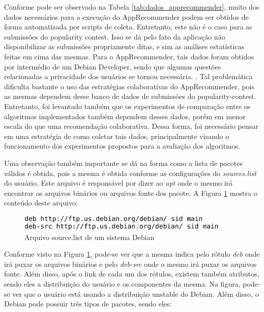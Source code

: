 Conforme pode ser observado na Tabela \ref{tab:dados_apprecommender}, muito dos dados
necessários para a execução do AppRecommender podem ser obtidos de forma automatizada
por scripts de coleta. Entretanto, este não é o caso para as submissões do
popularity contest. Isso se dá pelo fato da aplicação não disponibilizar as submissões
propriamente ditas, e sim as análises estatísticas feitas em cima das mesmas. Para o
AppRecommender, tais dados foram obtidos por intermédio de um Debian Developer, sendo
que algumas questões relacionadas a privacidade dos usuários se tornou necessária.
\cite{araujo2011apprecommender}. Tal problemática dificulta bastante o uso das
estratégias colaborativas do AppRecommender, pois as mesmas dependem desse banco de dados
de submissões do popularity-contest. Entretanto, foi levantado também que os
experimentos de comparação entre os algoritmos implementados também dependem
desses dados, porém em menor escala do que uma recomendação colaborativa.
Dessa forma, foi necessário pensar em uma estratégia
de como coletar tais dados, principalmente visando o funcionamento dos experimentos propostos
para a avaliação dos algoritmos.

Uma observação também importante se dá na forma como a lista de pacotes válidos
é obtida, pois a mesma é obtida conforme as configurações do \textit{sources.list} do usuário. Este arquivo é responsável
por dizer ao \textit{apt} onde o mesmo irá encontrar os arquivos binários ou
arquivos fonte dos pacote. A Figura \ref{fig:source_list} mostra o conteúdo deste arquivo:
\\

\begin{figure}[h]
  \centering
  \includegraphics[width=0.9\textwidth]{figuras/source_list.eps}
  \caption{Arquivo source.list de um sistema Debian}
  \label{fig:source_list}
\end{figure}

Conforme visto na Figura \ref{fig:source_list}, pode-se ver que a mesma indica
pelo rótulo \textit{deb} onde irá puxar os arquivos binários e pelo
\textit{deb-src} onde o mesmo irá puxar os arquivos fonte. Além disso, após o
link de cada um dos rótulos, existem também atributos, sendo eles a distribuição
do usuário e os componentes da mesma. Na figura, pode-se ver que o usuário está
usando a distribuição unstable do Debian. Além disso, o Debian pode possuir três
tipos de pacotes, sendo eles:

